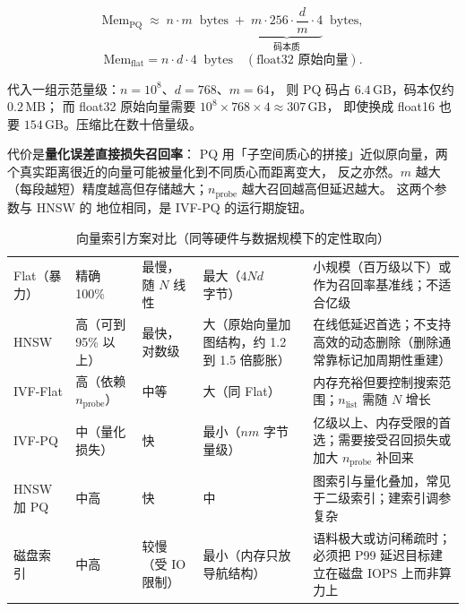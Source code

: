 \begin{equation}
\text{Mem}_{\text{PQ}} \;\approx\; n \cdot m \;\; \text{bytes}
\;+\; \underbrace{m \cdot 256 \cdot \frac{d}{m} \cdot 4}_{\text{码本质}} \;\; \text{bytes},
\label{eq:ivfpq-memory}
\end{equation}
\begin{equation}
\text{Mem}_{\text{flat}} = n \cdot d \cdot 4 \;\; \text{bytes} \quad (\text{float32 原始向量}).
\label{eq:flat-memory}
\end{equation}

代入一组示范量级：$n = 10^8$、$d = 768$、$m = 64$，
则 PQ 码占 $6.4$\,GB，码本仅约 $0.2$\,MB；
而 float32 原始向量需要 $10^8 \times 768 \times 4 \approx 307$\,GB，
即使换成 float16 也要 $154$\,GB。压缩比在数十倍量级。

代价是\textbf{量化误差直接损失召回率}：
PQ 用「子空间质心的拼接」近似原向量，两个真实距离很近的向量可能被量化到不同质心而距离变大，
反之亦然。$m$ 越大（每段越短）精度越高但存储越大；$n_{\text{probe}}$ 越大召回越高但延迟越大。
这两个参数与 HNSW 的  地位相同，是 IVF-PQ 的运行期旋钮。

\begin{table}[htbp]
\centering
\caption{向量索引方案对比（同等硬件与数据规模下的定性取向）}
\label{tab:index-compare}
\small
\begin{tabularx}{\textwidth}{L{1.9cm} L{1.7cm} L{1.9cm} L{2.1cm} Y}
\toprule
{} &  &  &  &  \\
\midrule
Flat（暴力） & 精确 100\% & 最慢，随 $N$ 线性 & 最大（$4Nd$ 字节） &
小规模（百万级以下）或作为召回率基准线；不适合亿级 \\
\addlinespace
HNSW & 高（可到 95\% 以上） & 最快，对数级 & 大（原始向量加图结构，约 1.2 到 1.5 倍膨胀） &
在线低延迟首选；不支持高效的动态删除（删除通常靠标记加周期性重建） \\
\addlinespace
IVF-Flat & 高（依赖 $n_{\text{probe}}$） & 中等 & 大（同 Flat） &
内存充裕但要控制搜索范围；$n_{\text{list}}$ 需随 $N$ 增长 \\
\addlinespace
IVF-PQ & 中（量化损失） & 快 & 最小（$nm$ 字节量级） &
亿级以上、内存受限的首选；需要接受召回损失或加大 $n_{\text{probe}}$ 补回来 \\
\addlinespace
HNSW 加 PQ & 中高 & 快 & 中 &
图索引与量化叠加，常见于二级索引；建索引调参复杂 \\
\addlinespace
磁盘索引 & 中高 & 较慢（受 IO 限制） & 最小（内存只放导航结构） &
语料极大或访问稀疏时；必须把 P99 延迟目标建立在磁盘 IOPS 上而非算力上 \\
\bottomrule
\end{tabularx}
\end{table}

